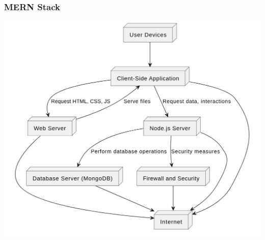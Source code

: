 \documentclass[a4paper, 12pt]{article}
\begin{document}
\subsubsection{MERN Stack}
\begin{center}
\includegraphics[width=1\textwidth]{component.png}\par
\end{center}
\end{document}
